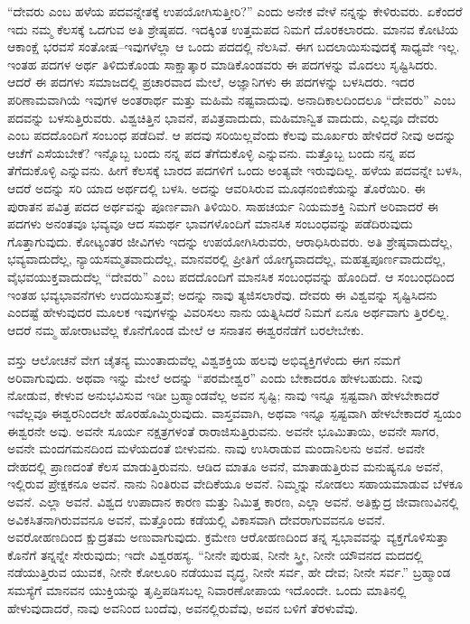 “ದೇವರು ಎಂಬ ಹಳೆಯ ಪದವನ್ನೇತಕ್ಕೆ ಉಪಯೋಗಿಸುತ್ತೀರಿ?” ಎಂದು ಅನೇಕ ವೇಳೆ ನನ್ನನ್ನು ಕೇಳಿರುವರು. ಏಕೆಂದರೆ ಇದು ನಮ್ಮ ಕೆಲಸಕ್ಕೆ ಒದಗುವ ಅತಿ ಶ್ರೇಷ್ಠಪದ. ಇದಕ್ಕಿಂತ ಉತ್ತಮಪದ ನಿಮಗೆ ದೊರಕಲಾರದು. ಮಾನವ ಕೋಟಿಯ ಆಕಾಂಕ್ಷೆ ಭರವಸೆ ಸಂತೋಷ–ಇವುಗಳೆಲ್ಲಾ ಆ ಒಂದು ಪದದಲ್ಲಿ ನೆಲಸಿವೆ. ಈಗ ಬದಲಾಯಿಸುವುದಕ್ಕೆ ಸಾಧ್ಯವೇ ಇಲ್ಲ. ಇಂತಹ ಪದಗಳ ಅರ್ಥ ತಿಳಿದುಕೊಂಡು ಸಾಕ್ಷಾತ್ಕಾರ ಮಾಡಿಕೊಂಡವರು ಈ ಪದಗಳನ್ನು ಮೊದಲು ಸೃಷ್ಟಿಸಿದರು. ಆದರೆ ಈ ಪದಗಳು ಸಮಾಜದಲ್ಲಿ ಪ್ರಚಾರವಾದ ಮೇಲೆ, ಅಜ್ಞಾನಿಗಳು ಈ ಪದಗಳನ್ನು ಬಳಸಿದರು. ಇದರ ಪರಿಣಾಮವಾಗಿಯೆ ಇವುಗಳ ಅಂತರಾರ್ಥ ಮತ್ತು ಮಹಿಮೆ ನಷ್ಟವಾದುವು. ಅನಾದಿಕಾಲದಿಂದಲೂ “ದೇವರು” ಎಂಬ ಪದವನ್ನು ಬಳಸುತ್ತಿರುವರು. ವಿಶ್ವಚಿತ್ತಿನ ಭಾವನೆ, ಪವಿತ್ರವಾದುದು, ಮಹಿಮಾನ್ವಿತ ವಾದುದು, ಎಲ್ಲವೂ ದೇವರು ಎಂಬ ಪದದೊಂದಿಗೆ ಸಂಬಂಧ ಪಡೆದಿವೆ. ಆ ಪದವು ಸರಿಯಿಲ್ಲವೆಂದು ಕೆಲವು ಮೂರ್ಖರು ಹೇಳಿದರೆ ನೀವು ಅದನ್ನು ಆಚೆಗೆ ಎಸೆಯಬೇಕೆ? ಇನ್ನೊಬ್ಬ ಬಂದು ನನ್ನ ಪದ ತೆಗೆದುಕೊಳ್ಳಿ ಎನ್ನುವನು. ಮತ್ತೊಬ್ಬ ಬಂದು ನನ್ನ ಪದ ತೆಗೆದುಕೊಳ್ಳಿ ಎನ್ನುವನು. ಹೀಗೆ ಕೆಲಸಕ್ಕೆ ಬಾರದ ಪದಗಳಿಗೆ ಒಂದು ಅಂತ್ಯವೇ ಇರುವುದಿಲ್ಲ. ಹಳೆಯ ಪದವನ್ನೇ ಬಳಸಿ, ಆದರೆ ಅದನ್ನು ಸರಿ ಯಾದ ಅರ್ಥದಲ್ಲಿ ಬಳಸಿ. ಅದನ್ನು ಆವರಿಸಿರುವ ಮೂಢನಂಬಿಕೆಯನ್ನು ತೊರೆಯಿರಿ. ಈ ಪುರಾತನ ಪವಿತ್ರ ಪದದ ಅರ್ಥವನ್ನು ಪೂರ್ಣವಾಗಿ ತಿಳಿಯಿರಿ. ಸಾಹಚರ್ಯ ನಿಯಮಶಕ್ತಿ ನಿಮಗೆ ಅರಿವಾದರೆ ಈ ಪದಗಳು ಅನಂತವೂ ಭವ್ಯವೂ ಆದ ಸಮರ್ಥ ಭಾವಗಳೊಂದಿಗೆ ಮಾನಸಿಕ ಸಂಬಂಧವನ್ನು ಪಡೆದಿರುವುದು ಗೊತ್ತಾಗುವುದು. ಕೋಟ್ಯಂತರ ಜೀವಿಗಳು ಇದನ್ನು ಉಪಯೋಗಿಸಿರುವರು, ಆರಾಧಿಸಿರುವರು. ಅತಿ ಶ್ರೇಷ್ಠವಾದುದೆಲ್ಲ, ಭವ್ಯವಾದುದೆಲ್ಲ, ನ್ಯಾಯಸಮ್ಮತವಾದುದೆಲ್ಲ, ಮಾನವರಲ್ಲಿ ಪ್ರೀತಿಗೆ ಯೋಗ್ಯವಾದದೆಲ್ಲ, ಮಹತ್ವಪೂರ್ಣವಾದುದೆಲ್ಲ, ವೈಭವಯುಕ್ತವಾದುದೆಲ್ಲ “ದೇವರು” ಎಂಬ ಪದದೊಂದಿಗೆ ಮಾನಸಿಕ ಸಂಬಂಧವನ್ನು ಹೊಂದಿದೆ. ಆ ಸಂಬಂಧದಿಂದ ಇಂತಹ ಭವ್ಯಭಾವನೆಗಳು ಉದಯಿಸುತ್ತವೆ; ಅದನ್ನು ನಾವು ತ್ಯಜಿಸಲಾರೆವು. ದೇವರು ಈ ವಿಶ್ವವನ್ನು ಸೃಷ್ಟಿಸಿದನು ಎಂದಷ್ಟೆ ಹೇಳುವುದರ ಮೂಲಕ ಇವುಗಳನ್ನು ವಿವರಿಸಲು ನಾನು ಯತ್ನಿಸಿದರೆ ನಿಮಗೆ ಏನೂ ಅರ್ಥವಾಗು ತ್ತಿರಲಿಲ್ಲ. ಆದರೆ ನಮ್ಮ ಹೋರಾಟವೆಲ್ಲ ಕೊನೆಗೊಂಡ ಮೇಲೆ ಆ ಸನಾತನ ಈಶ್ವರನೆಡೆಗೆ ಬರಲೇಬೇಕು.

ವಸ್ತು ಆಲೋಚನೆ ವೇಗ ಚೈತನ್ಯ ಮುಂತಾದುವೆಲ್ಲ ವಿಶ್ವಶಕ್ತಿಯ ಹಲವು ಅಭಿವ್ಯಕ್ತಿಗಳೆಂದು ಈಗ ನಮಗೆ ಅರಿವಾಗುವುದು. ಅಥವಾ ಇನ್ನು ಮೇಲೆ ಅದನ್ನು “ಪರಮೇಶ್ವರ” ಎಂದು ಬೇಕಾದರೂ ಹೇಳಬಹುದು. ನೀವು ನೋಡುವ, ಕೇಳುವ ಅನುಭವಿಸುವ ಇಡೀ ಬ್ರಹ್ಮಾಂಡವೆಲ್ಲ ಅವನ ಸೃಷ್ಟಿ; ನಾವು ಇನ್ನೂ ಸ್ಪಷ್ಟವಾಗಿ ಹೇಳಬೇಕಾದರೆ ಇವೆಲ್ಲವೂ ಈಶ್ವರನಿಂದಲೇ ಹೊರಹೊಮ್ಮಿರುವುದು. ವಾಸ್ತವವಾಗಿ, ಅಥವಾ ಇನ್ನೂ ಸ್ಪಷ್ಟವಾಗಿ ಹೇಳಬೇಕಾದರೆ ಸ್ವಯಂ ಈಶ್ವರನೇ ಅವು. ಅವನೇ ಸೂರ್ಯ ನಕ್ಷತ್ರಗಳಂತೆ ರಾರಾಜಿಸುತ್ತಿರುವನು. ಅವನೇ ಭೂಮಿತಾಯಿ, ಅವನೇ ಸಾಗರ, ಅವನೇ ಮಂದಗಮನದಿಂದ ಮಳೆಯದಂತೆ ಬೀಳುವನು. ನಾವು ಉಸಿರಾಡುವ ಮಂದಾನಿಲನು ಅವನೆ. ಅವನೇ ದೇಹದಲ್ಲಿ ಪ್ರಾಣದಂತೆ ಕೆಲಸ ಮಾಡುತ್ತಿರುವನು. ಆಡಿದ ಮಾತೂ ಅವನೆ, ಮಾತಾಡುತ್ತಿರುವ ಮನುಷ್ಯನೂ ಅವನೆ, ಇಲ್ಲಿರುವ ಪ್ರೇಕ್ಷಕನೂ ಅವನೆ. ನಾನು ನಿಂತಿರುವ ವೇದಿಕೆಯೂ ಅವನೆ. ನಿಮ್ಮನ್ನು ನೋಡಲು ಸಹಾಯಮಾಡುವ ಬೆಳಕೂ ಅವನೆ. ಎಲ್ಲಾ ಅವನೆ. ವಿಶ್ವದ ಉಪಾದಾನ ಕಾರಣ ಮತ್ತು ನಿಮಿತ್ತ ಕಾರಣ, ಎಲ್ಲಾ ಅವನೆ. ಅತಿಕ್ಷುದ್ರ ಜೀವಾಣುವಿನಲ್ಲಿ ಅವಿಕಸಿತನಾಗಿರುವವನೂ ಅವನೆ, ಮತ್ತೊಂದು ಕಡೆಯಲ್ಲಿ ವಿಕಾಸವಾಗಿ ದೇವರಾಗುವವನೂ ಅವನೆ. ಅವರೋಹಣದಿಂದ ಕ್ಷುದ್ರತಮ ಅಣುವಾಗುವುದು. ಕ್ರಮೇಣ ಆರೋಹಣದಿಂದ ತನ್ನ ಸ್ವಭಾವವನ್ನು ವ್ಯಕ್ತಗೊಳಿಸುತ್ತಾ ಕೊನೆಗೆ ತನ್ನನ್ನೇ ಸೇರುವುದು; ಇದೇ ವಿಶ್ವರಹಸ್ಯ. “ನೀನೇ ಪುರುಷ, ನೀನೇ ಸ್ತ್ರೀ, ನೀನೇ ಯೌವನದ ಮದದಲ್ಲಿ ನಡೆಯುತ್ತಿರುವ ಯುವಕ, ನೀನೇ ಕೋಲೂರಿ ನಡೆಯುವ ವೃದ್ಧ, ನೀನೇ ಸರ್ವ, ಹೇ ದೇವ; ನೀನೇ ಸರ್ವ.” ಬ್ರಹ್ಮಾಂಡ ಸಮಸ್ಯೆಗೆ ಮಾನವನ ಯುಕ್ತಿಯನ್ನು ತೃಪ್ತಿಪಡಿಸಬಲ್ಲ ನಿವಾರಣೋಪಾಯ ಇದೊಂದೇ. ಒಂದು ಮಾತಿನಲ್ಲಿ ಹೇಳುವುದಾದರೆ, ನಾವು ಅವನಿಂದ ಬಂದೆವು, ಅವನಲ್ಲಿರುವೆವು, ಅವನ ಬಳಿಗೆ ತೆರಳುವೆವು.

